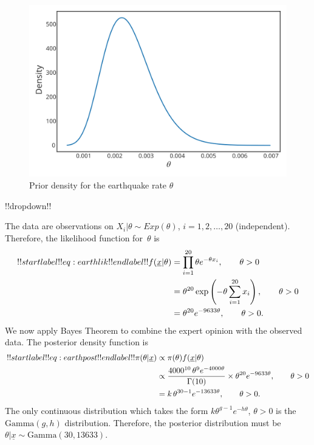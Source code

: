 {\begin{figure}[ht]
\includegraphics{images/priorplot4.svg}
\caption{Prior density for the earthquake rate $\theta$}
\label{fig:earthprior}

\end{figure}



!!dropdown!!

The data are observations on $X_i|\theta\sim Exp(\theta)$, $i=1,2,\ldots,20$ (independent). Therefore, the likelihood function for~$\theta$ is
    \begin{align}
    !!startlabel!! eq:earthlik !!endlabel!!
    f(\underline{x}|\theta)&=\prod_{i=1}^{20} \theta e^{-\theta x_i}, 
    \quad\quad\theta>0 \notag \\
    &=\theta^{20}\exp\left(-\theta\sum_{i=1}^{20} x_i\right),
    \quad\quad\theta>0 \notag \\
    &=\theta^{20} e^{-9633\theta},
    \quad\quad\theta>0. 
    \end{align}
    We now apply Bayes Theorem to combine the expert opinion with the observed data. The posterior density function is
    \begin{align}
    !!startlabel!! eq:earthpost !!endlabel!!
    \pi(\theta|\underline{x})&\propto\pi(\theta)f(\underline{x}|\theta) \notag \\
    &\propto\frac{4000^{10}\,\theta^{9}e^{-4000\theta}}{\Gamma(10)}\times
    \theta^{20} e^{-9633\theta},\quad\quad\theta>0 \notag  \\
    &=k\,\theta^{30-1}e^{-13633\theta},\quad\quad\theta>0.
    \end{align}
    The only continuous distribution which takes the form
    $k\theta^{g-1}e^{-h\theta}$, $\theta>0$ is the $\mathrm{Gamma}(g,h)$ distribution.
    Therefore, the posterior distribution must be $\theta|\underline{x}\sim
    \mathrm{Gamma}(30,13633)$.

}
